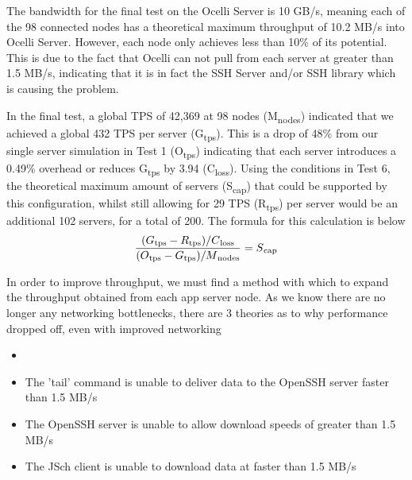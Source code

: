 \documentclass{llncs}
\begin{document}
The bandwidth for the final test on the Ocelli Server is 10 GB/s, meaning each of the 98 connected nodes has a theoretical maximum throughput of 10.2 MB/s into Ocelli Server. However, each node only achieves less than 10\% of its potential. This is due to the fact that Ocelli can not pull from each server at greater than 1.5 MB/s, indicating that it is in fact the SSH Server and/or SSH library which is causing the problem.

In the final test, a global TPS of 42,369 at 98 nodes (M\textsubscript{nodes}) indicated that we achieved a global 432 TPS per server (G\textsubscript{tps}). This is a drop of 48\% from our single server simulation in Test 1 (O\textsubscript{tps}) indicating that each server introduces a 0.49\% overhead or reduces G\textsubscript{tps} by 3.94 (C\textsubscript{loss}). Using the conditions in Test 6, the theoretical maximum amount of servers (S\textsubscript{cap}) that could be supported by this configuration, whilst still allowing for 29 TPS (R\textsubscript{tps}) per server would be an additional 102 servers, for a total of 200. The formula for this calculation is below
\\
\begin{align}
\dfrac{ (G\textsubscript{tps} - R\textsubscript{tps}) / C\textsubscript{loss}}{ (O\textsubscript{tps} - G\textsubscript{tps}) / M\textsubscript{nodes}} = S\textsubscript{cap}
\end{align}

In order to improve throughput, we must find a method with which to expand the throughput obtained from each app server node. As we know there are no longer any networking bottlenecks, there are 3 theories as to why performance dropped off, even with improved networking

\begin{itemize}
\item 
\item The 'tail' command is unable to deliver data to the OpenSSH server faster than 1.5 MB/s
\item The OpenSSH server is unable to allow download speeds of greater than 1.5 MB/s
\item The JSch client is unable to download data at faster than 1.5 MB/s
\end{itemize}
\end{document}
